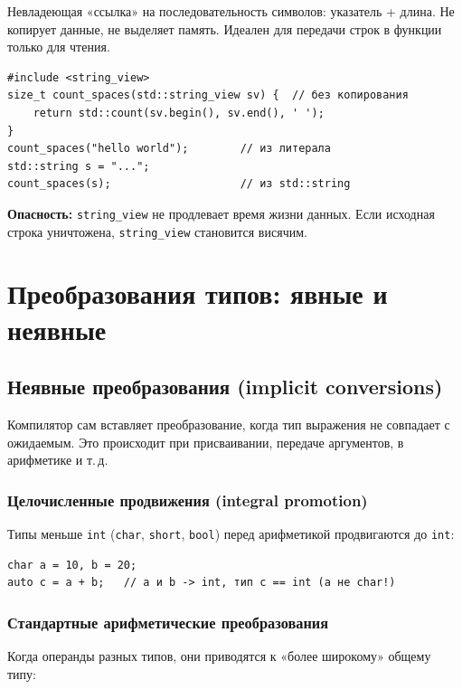 Невладеющая «ссылка» на последовательность символов: указатель + длина. Не
копирует данные, не выделяет память. Идеален для передачи строк в функции
только для чтения.

\begin{lstlisting}
#include <string_view>
size_t count_spaces(std::string_view sv) {  // без копирования
    return std::count(sv.begin(), sv.end(), ' ');
}
count_spaces("hello world");        // из литерала
std::string s = "...";
count_spaces(s);                    // из std::string
\end{lstlisting}

\textbf{Опасность:} \texttt{string\_view} не продлевает время жизни данных. Если
исходная строка уничтожена, \texttt{string\_view} становится висячим.


\section{Преобразования типов: явные и неявные}

\subsection{Неявные преобразования (implicit conversions)}

Компилятор сам вставляет преобразование, когда тип выражения не совпадает с
ожидаемым. Это происходит при присваивании, передаче аргументов, в
арифметике и т.\,д.

\subsubsection{Целочисленные продвижения (integral promotion)}

Типы меньше \texttt{int} (\texttt{char}, \texttt{short}, \texttt{bool}) перед
арифметикой продвигаются до \texttt{int}:

\begin{lstlisting}
char a = 10, b = 20;
auto c = a + b;   // a и b -> int, тип c == int (а не char!)
\end{lstlisting}

\subsubsection{Стандартные арифметические преобразования}

Когда операнды разных типов, они приводятся к «более широкому» общему типу:

